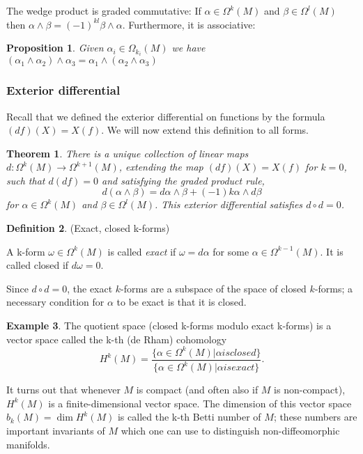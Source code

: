 \documentclass{article}
\newtheorem{theorem}{Theorem}[section]
\newtheorem{proposition}{Proposition}[theorem]
\theoremstyle{definition}
\newtheorem{defn}[theorem]{Definition}
\newtheorem{example}[theorem]{Example}
\newenvironment{definition}
  {\vspace{8pt}\begin{mdframed}[backgroundcolor=blueish,innertopmargin=4]\begin{defn}}
  {\end{defn}\end{mdframed}\vspace{4pt}}
\begin{document}
The wedge product is graded commutative: If $\alpha \in \Omega^k (M)$ and $\beta \in \Omega^l (M)$ then $\alpha \wedge \beta = (-1) ^{kl}\beta \wedge \alpha $. Furthermore, it is associative:

\begin{proposition}
Given $\alpha_i \in \Omega_{k_i} (M)$ we have $(\alpha_1 \wedge \alpha_2)\wedge \alpha_3 = \alpha_1 \wedge (\alpha_2 \wedge \alpha_3)$
\end{proposition}

\subsubsection{Exterior differential}
Recall that we defined the exterior differential on functions by the formula $(d f)(X) = X(f)$. We will now extend this definition to all forms.

\begin{theorem}

There is a unique collection of linear maps $d : \Omega^k (M) \rightarrow \Omega^{k+1} (M)$, extending the map $(d f)(X) = X(f)$ for $k = 0$, such that $d(d f) = 0$ and satisfying the graded product rule, 
\[
    d(\alpha \wedge \beta) = d\alpha \wedge \beta + (-1) k\alpha \wedge d\beta 
\]
for $\alpha \in \Omega^k (M)$ and $\beta \in \Omega^l (M)$. This exterior differential satisfies $d \circ d = 0$.
\end{theorem}

\begin{definition} (Exact, closed k-forms)

A k-form $\omega \in \Omega^k (M)$ is called \textit{exact} if $\omega = d\alpha$ for some $\alpha \in \Omega^{k-1} (M)$. It is called closed if $d\omega = 0$.
\end{definition}

Since $d\circ d = 0$, the exact $k$-forms are a subspace of the space of closed $k$-forms; a necessary condition for $\alpha$ to be exact is that it is closed.

\begin{example}

The quotient space (closed k-forms modulo exact k-forms) is a vector space called the k-th (de Rham) cohomology
\[
H^k (M) = \frac{\{\alpha \in \Omega^k (M)| \alpha is closed \}}{\{\alpha \in \Omega^k(M)| \alpha is exact \}}.
\]

It turns out that whenever $M$ is compact (and often also if $M$ is non-compact), $H ^k (M)$ is a finite-dimensional vector space. The dimension of this vector space $b_k(M) = \dim H^k (M)$ is called the k-th Betti number of $M$; these numbers are important invariants of $M$ which one can use to distinguish non-diffeomorphic manifolds.
\end{example}
\end{document}
